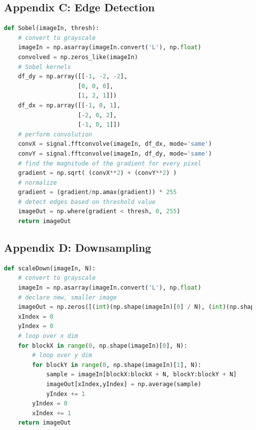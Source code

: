 \documentclass[11pt,a4paper]{article}
\begin{document}
\pagebreak
    
\subsection{Appendix C: Edge Detection} \label{app:edge}
    \begin{lstlisting}[language=Python,label={lst:edge}]
def Sobel(imageIn, thresh):
    # convert to grayscale
    imageIn = np.asarray(imageIn.convert('L'), np.float)
    convolved = np.zeros_like(imageIn)
    # Sobel kernels
    df_dy = np.array([[-1, -2, -2],
                     [0, 0, 0],
                     [1, 2, 1]])
    df_dx = np.array([[-1, 0, 1],
                     [-2, 0, 2],
                     [-1, 0, 1]])
    # perform convolution
    convX = signal.fftconvolve(imageIn, df_dx, mode='same')
    convY = signal.fftconvolve(imageIn, df_dy, mode='same')
    # find the magnitude of the gradient for every pixel
    gradient = np.sqrt( (convX**2) + (convY**2) )
    # normalize
    gradient = (gradient/np.amax(gradient)) * 255
    # detect edges based on threshold value
    imageOut = np.where(gradient < thresh, 0, 255)
    return imageOut
	\end{lstlisting}
	
\subsection{Appendix D: Downsampling} \label{app:downsample}
	\begin{lstlisting}[language=Python]
def scaleDown(imageIn, N):
    # convert to grayscale
    imageIn = np.asarray(imageIn.convert('L'), np.float)
    # declare new, smaller image
    imageOut = np.zeros([(int)(np.shape(imageIn)[0] / N), (int)(np.shape(imageIn)[1] / N)])
    xIndex = 0
    yIndex = 0
    # loop over x dim
    for blockX in range(0, np.shape(imageIn)[0], N):
        # loop over y dim
        for blockY in range(0, np.shape(imageIn)[1], N):
            sample = imageIn[blockX:blockX + N, blockY:blockY + N]
            imageOut[xIndex,yIndex] = np.average(sample)
            yIndex += 1
        yIndex = 0
        xIndex += 1
    return imageOut
    \end{lstlisting}
    
\pagebreak
    
\end{document}
